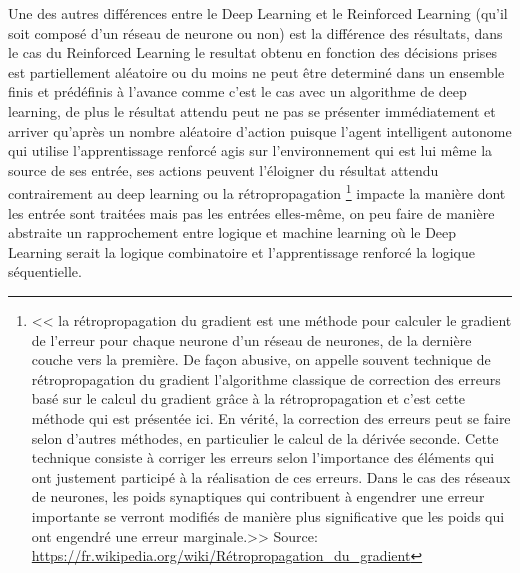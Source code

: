 Une des autres différences entre le Deep Learning et le Reinforced Learning
(qu'il soit composé d'un réseau de neurone ou non) est la différence des résultats,
dans le cas du Reinforced Learning le resultat obtenu en fonction des décisions
prises est partiellement aléatoire ou du moins ne peut être determiné dans un ensemble finis
et prédéfinis à l'avance comme c'est le cas avec un algorithme de deep learning,
de plus le résultat attendu peut ne pas se présenter immédiatement et arriver
qu'après un nombre aléatoire d'action puisque l'agent intelligent autonome qui utilise
l'apprentissage renforcé agis sur l'environnement qui est lui même la source de
ses entrée, ses actions peuvent l'éloigner du résultat attendu contrairement
au deep learning ou la rétropropagation
\footnote{<< la rétropropagation du gradient est une méthode pour calculer le gradient de l'erreur
pour chaque neurone d'un réseau de neurones, de la dernière couche vers la première.
De façon abusive, on appelle souvent technique de rétropropagation du gradient l'algorithme classique
de correction des erreurs basé sur le calcul du gradient grâce à la rétropropagation et
c'est cette méthode qui est présentée ici. En vérité, la correction des erreurs peut se faire selon
d'autres méthodes, en particulier le calcul de la dérivée seconde. Cette technique consiste à corriger
les erreurs selon l'importance des éléments qui ont justement participé à la réalisation de ces erreurs.
Dans le cas des réseaux de neurones, les poids synaptiques qui contribuent à engendrer une
erreur importante se verront modifiés de manière plus significative que les poids qui ont engendré
une erreur marginale.>> \newline
Source: \url{https://fr.wikipedia.org/wiki/Rétropropagation_du_gradient}}
impacte la manière dont les entrée
sont traitées mais pas les entrées elles-même, on peu faire de manière abstraite un rapprochement
entre logique et machine learning où le Deep Learning serait la logique combinatoire et
l'apprentissage renforcé la logique séquentielle. \newline










